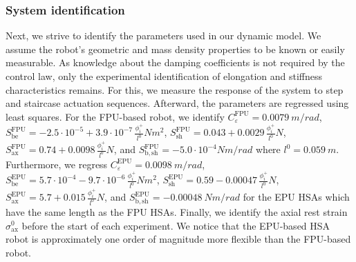 \subsubsection{System identification}\label{ssub:hsamodel:planar_hsa_robot_model:model_verification:system_identification}
Next, we strive to identify the parameters used in our dynamic model.
We assume the robot's geometric and mass density properties to be known or easily measurable. %
As knowledge about the damping coefficients is not required by the control law, only the experimental identification of elongation and stiffness characteristics remains.
For this, we measure the response of the system to step and staircase actuation sequences. Afterward, the parameters are regressed using least squares. %
For the FPU-based robot, we identify $C_\varepsilon^\mathrm{FPU}=\SI{0.0079}{m \per rad}$, $S_\mathrm{be}^\mathrm{FPU} = -2.5 \cdot 10^{-5} + 3.9 \cdot 10^{-7} \, \frac{\phi_i^+}{l^0} \si{Nm^2}$, $S_\mathrm{sh}^\mathrm{FPU} = 0.043 + 0.0029 \, \frac{\phi_i^+}{l^0} \si{N}$, $S_\mathrm{ax}^\mathrm{FPU} = 0.74 + 0.0098 \, \frac{\phi_i^+}{l^0} \si{N}$, and $S_\mathrm{b,sh}^\mathrm{FPU} = -5.0 \cdot 10^{-4} \si{Nm \per rad}$ where $l^0 = \SI{0.059}{m}$. 
Furthermore, we regress $C_\varepsilon^\mathrm{EPU}=\SI{0.0098}{m \per rad}$, $S_\mathrm{be}^\mathrm{EPU} = 5.7 \cdot 10^{-4} -9.7 \cdot 10^{-6} \, \frac{\phi_i^+}{l^0} \si{Nm^2}$, $S_\mathrm{sh}^\mathrm{EPU} = 0.59 - 0.00047 \, \frac{\phi_i^+}{l^0} \si{N}$, $S_\mathrm{ax}^\mathrm{EPU} = 5.7 + 0.015 \, \frac{\phi_i^+}{l^0} \si{N}$, and $S_\mathrm{b,sh}^\mathrm{EPU} = -\SI{0.00048}{Nm \per rad}$ for the EPU \glspl{HSA} which have the same length as the FPU \glspl{HSA}.
Finally, we identify the axial rest strain $\sigma_\mathrm{ax}^0$ before the start of each experiment.
We notice that the EPU-based HSA robot is approximately one order of magnitude more flexible than the FPU-based robot.

